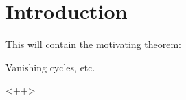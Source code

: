 \chapter{Introduction}

This will contain the motivating theorem:
\begin{Thm}
    \label{thm:motivation}%
    Vanishing cycles, etc.
\end{Thm}<++>

